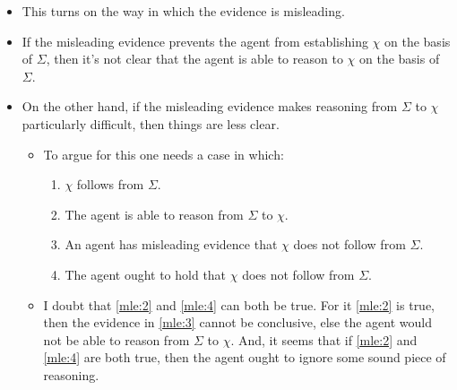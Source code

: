 \documentclass[10pt]{article}
\begin{document}
\begin{itemize}
\item This turns on the way in which the evidence is misleading.
\item If the misleading evidence prevents the agent from establishing \(\chi\) on the basis of \(\Sigma\), then it's not clear that the agent is able to reason to \(\chi\) on the basis of \(\Sigma\).
\item On the other hand, if the misleading evidence makes reasoning from \(\Sigma\) to \(\chi\) particularly difficult, then things are less clear.
  \begin{itemize}
  \item To argue for this one needs a case in which:
    \begin{enumerate}
    \item \(\chi\) follows from \(\Sigma\).
    \item\label{mle:2} The agent is able to reason from \(\Sigma\) to \(\chi\).
    \item\label{mle:3} An agent has misleading evidence that \(\chi\) does not follow from \(\Sigma\).
    \item\label{mle:4} The agent ought to hold that \(\chi\) does not follow from \(\Sigma\).
    \end{enumerate}
  \item I doubt that \ref{mle:2} and \ref{mle:4} can both be true.
    For it \ref{mle:2} is true, then the evidence in \ref{mle:3} cannot be conclusive, else the agent would not be able to reason from \(\Sigma\) to \(\chi\).
    And, it seems that if \ref{mle:2} and \ref{mle:4} are both true, then the agent ought to ignore some sound piece of reasoning.
  \end{itemize}
\end{itemize}


\end{document}
